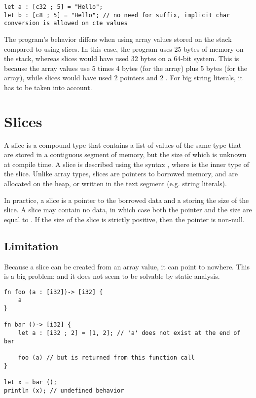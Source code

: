 \begin{lstlisting}[style=coloredverbatim]
let a : [c32 ; 5] = "Hello";
let b : [c8 ; 5] = "Hello"; // no need for suffix, implicit char conversion is allowed on cte values
\end{lstlisting}

The program's behavior differs when using array values stored on the stack
compared to using slices. In this case, the program uses 25 bytes of memory on
the stack, whereas slices would have used 32 bytes on a 64-bit system. This is
because the array values use 5 times 4 bytes (for the  array) plus 5
bytes (for the  array), while slices would have used 2 pointers and 2
. For big string literals, it has to be taken into account.

\section{Slices}%
\label{sec:slices}

A slice is a compound type that contains a list of values of the same type that
are stored in a contiguous segment of memory, but the size of which is unknown
at compile time. A slice is described using the syntax \token{[T]}, where
 is the inner type of the slice. Unlike array types, slices are
pointers to borrowed memory, and are allocated on the heap, or written in the
text segment (e.g. string literals).

In practice, a slice is a pointer  to the borrowed data and a
 storing the size of the slice. A slice may contain no data, in
which case both the pointer and the size are equal to . If the size of
the slice is strictly positive, then the pointer is non-null.




\subsection{Limitation}%
\label{sec:slice_lim}

Because a slice can be created from an array value, it can point to nowhere.
This is a big problem; and it does not seem to be solvable by static analysis.

\begin{lstlisting}[style=coloredverbatim]
fn foo (a : [i32])-> [i32] {
    a
}

fn bar ()-> [i32] {
    let a : [i32 ; 2] = [1, 2]; // 'a' does not exist at the end of bar

    foo (a) // but is returned from this function call
}

let x = bar ();
println (x); // undefined behavior
\end{lstlisting}

